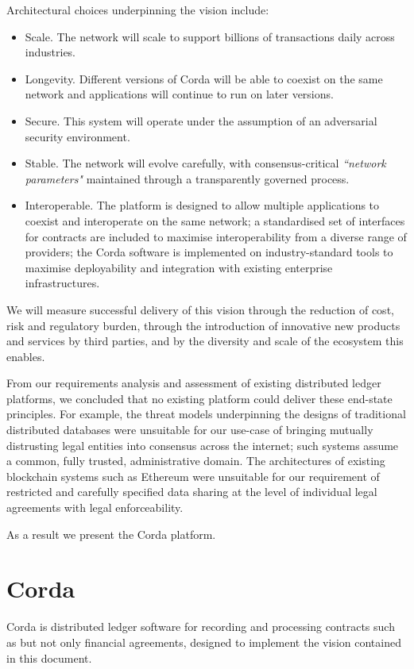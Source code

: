 \documentclass{article}
\begin{document}
Architectural choices underpinning the vision include:
\begin{itemize}
    \item Scale. The network will scale to support billions of transactions daily across industries.
    \item Longevity. Different versions of Corda will be able to coexist on the same network and applications will continue to run on later versions.
    \item Secure. This system will operate under the assumption of an adversarial security environment.
    \item Stable. The network will evolve carefully, with consensus-critical \textit{``network parameters"} maintained through a transparently governed process.
    \item Interoperable. The platform is designed to allow multiple applications to coexist and interoperate on the same network; a standardised set of interfaces for contracts are included to maximise interoperability from a diverse range of providers; the Corda software is implemented on industry-standard tools to maximise deployability and integration with existing enterprise infrastructures.
\end{itemize}

We will measure successful delivery of this vision through the reduction of cost, risk and regulatory burden, through the introduction of innovative new products and services by third parties, and by the diversity and scale of the ecosystem this enables.

From our requirements analysis and assessment of existing distributed ledger platforms, we concluded that no existing platform could deliver these end-state principles. For example, the threat models underpinning the designs of traditional distributed databases were unsuitable for our use-case of bringing mutually distrusting legal entities into consensus across the internet; such systems assume a common, fully trusted, administrative domain. The architectures of existing blockchain systems such as Ethereum were unsuitable for our requirement of restricted and carefully specified data sharing at the level of individual legal agreements with legal enforceability.

As a result we present the Corda platform.

\section{Corda}
Corda is distributed ledger software for recording and processing contracts such as but not only financial agreements, designed to implement the vision contained in this document.
\end{document}
